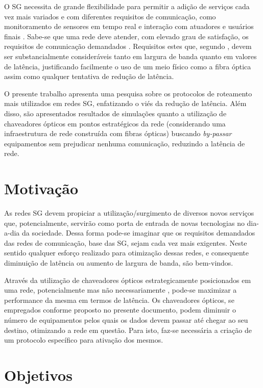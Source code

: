 O SG necessita de grande flexibilidade para permitir a adição de serviços cada vez mais variados e com diferentes requisitos de comunicação, como monitoramento de sensores em tempo real e interação com atuadores e usuários finais \cite{Art-Aggarwal2010}. Sabe-se que uma rede  deve atender, com elevado grau de satisfação, os requisitos de comunicação demandados \cite{Conf-Lobo2008}. Requisitos estes que, segundo \cite{Art-Aggarwal2010}, devem ser substancialmente consideráveis tanto em largura de banda quanto em valores de latência, justificando facilmente o uso de um meio físico como a fibra óptica assim como qualquer tentativa de redução de latência. 

O presente trabalho apresenta uma pesquisa sobre os protocolos de roteamento mais utilizados em redes SG, enfatizando o viés da redução de latência. Além disso, são apresentados resultados de simulações quanto a utilização de chaveadores ópticos em pontos estratégicos da rede (considerando uma infraestrutura de rede construída com fibras ópticas) buscando \emph{by-passar} equipamentos sem prejudicar nenhuma comunicação, reduzindo a latência de rede.

\section{Motivação}
As redes SG devem propiciar a utilização/surgimento de diversos novos serviços que, potencialmente, servirão como porta de entrada de novas tecnologias no dia-a-dia da sociedade. Dessa forma pode-se imaginar que os requisitos demandados das redes de comunicação, base das SG, sejam cada vez mais exigentes. Neste sentido qualquer esforço realizado para otimização dessas redes, e consequente diminuição de latência ou aumento de largura de banda, são bem-vindos.

Através da utilização de chaveadores ópticos estrategicamente posicionados em uma rede, potencialmente mas não necessariamente , pode-se maximizar a performance da mesma em termos de latência. Os chaveadores ópticos, se empregados conforme proposto no presente documento, podem diminuir o número de equipamentos pelos quais os dados devem passar até chegar ao seu destino, otimizando a rede em questão. Para isto, faz-se necessária a criação de um protocolo específico para ativação dos mesmos.

\section{Objetivos}
